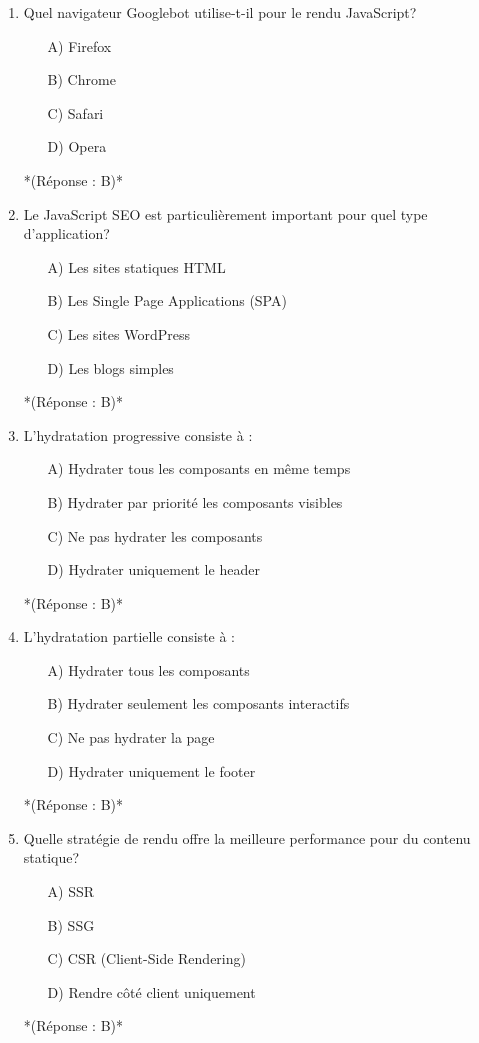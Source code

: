 \documentclass[12pt,a4paper,twoside]{report}
\begin{document}
\begin{enumerate}
\item Quel navigateur Googlebot utilise-t-il pour le rendu JavaScript?
\begin{itemize}
\item[A)] Firefox
\item[B)] Chrome
\item[C)] Safari
\item[D)] Opera
\end{itemize}
*(Réponse : B)*

\item Le JavaScript SEO est particulièrement important pour quel type d'application?
\begin{itemize}
\item[A)] Les sites statiques HTML
\item[B)] Les Single Page Applications (SPA)
\item[C)] Les sites WordPress
\item[D)] Les blogs simples
\end{itemize}
*(Réponse : B)*

\item L'hydratation progressive consiste à :
\begin{itemize}
\item[A)] Hydrater tous les composants en même temps
\item[B)] Hydrater par priorité les composants visibles
\item[C)] Ne pas hydrater les composants
\item[D)] Hydrater uniquement le header
\end{itemize}
*(Réponse : B)*

\item L'hydratation partielle consiste à :
\begin{itemize}
\item[A)] Hydrater tous les composants
\item[B)] Hydrater seulement les composants interactifs
\item[C)] Ne pas hydrater la page
\item[D)] Hydrater uniquement le footer
\end{itemize}
*(Réponse : B)*

\item Quelle stratégie de rendu offre la meilleure performance pour du contenu statique?
\begin{itemize}
\item[A)] SSR
\item[B)] SSG
\item[C)] CSR (Client-Side Rendering)
\item[D)] Rendre côté client uniquement
\end{itemize}
*(Réponse : B)*


\end{enumerate}
\end{document}
